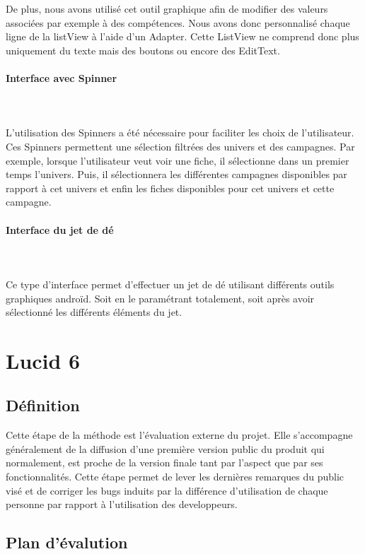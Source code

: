 \documentclass[11pt,a4paper]{article}
\begin{document}
De plus, nous avons utilisé cet outil graphique afin de modifier des valeurs
associées par exemple à des compétences. Nous avons donc personnalisé chaque
ligne de la listView à l'aide d'un Adapter. Cette ListView ne comprend donc
plus uniquement du texte mais des boutons ou encore des EditText.

\paragraph{Interface avec Spinner}
~\\
~\\
L'utilisation des Spinners a été nécessaire pour faciliter les choix de
l'utilisateur. Ces Spinners permettent une sélection filtrées des univers et des
campagnes. Par exemple, lorsque l'utilisateur veut voir une fiche, il
sélectionne dans un premier temps l'univers. Puis, il sélectionnera les
différentes campagnes disponibles par rapport à cet univers et enfin les fiches
disponibles pour cet univers et cette campagne.

\paragraph{Interface du jet de dé}
~\\
~\\
Ce type d'interface permet d'effectuer un jet de dé utilisant différents outils
graphiques androïd. Soit en le paramétrant totalement, soit après avoir
sélectionné les différents éléments du jet.

\section{Lucid 6}

\subsection{Définition}

Cette étape de la méthode est l'évaluation externe du projet. Elle s'accompagne
généralement de la diffusion d'une première version public du produit qui
normalement, est proche de la version finale tant par l'aspect que par ses
fonctionnalités.
Cette étape permet de lever les dernières remarques du public visé et de
corriger les bugs induits par la différence d'utilisation de chaque personne par
rapport à l'utilisation des developpeurs.


\subsection{Plan d'évalution}
\end{document}
